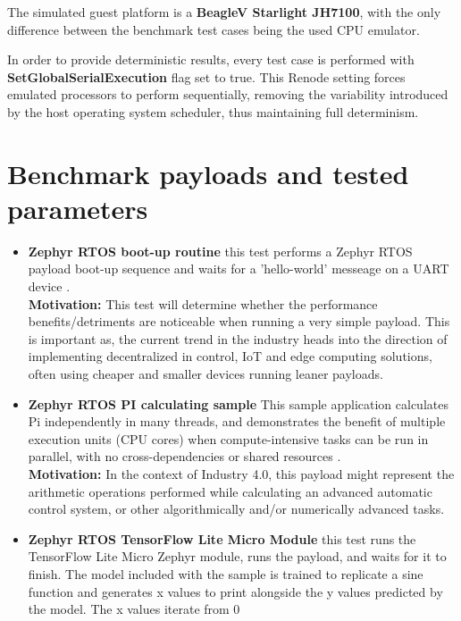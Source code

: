 The simulated guest platform is a \textbf{BeagleV Starlight JH7100}, with the only difference between the benchmark test
cases being the used CPU emulator.

In order to provide deterministic results, every test case is performed with \textbf{SetGlobalSerialExecution}
flag set to true. This Renode setting forces emulated processors to perform sequentially, removing the variability
introduced by the host operating system scheduler, thus maintaining full determinism.

\pagebreak

\section{Benchmark payloads and tested parameters}

\begin{itemize}
    \item{\textbf{Zephyr RTOS boot-up routine} this test performs a Zephyr RTOS payload boot-up sequence and waits for
    a 'hello-world' messeage on a UART device \cite{ZephyrHello}.\\
    \textbf{Motivation:} This test will determine whether the performance benefits/detriments are noticeable when
    running a very simple payload. This is important as, the current trend in the industry heads into the
    direction of implementing decentralized in control, IoT and edge computing solutions, often using cheaper and
    smaller devices running leaner payloads.}
    \item{\textbf{Zephyr RTOS PI calculating sample} This sample application calculates Pi independently in many
    threads, and demonstrates the benefit of multiple execution units (CPU cores) when compute-intensive tasks can be
    run in parallel, with no cross-dependencies or shared resources \cite{ZephyrPi}.\\
    \textbf{Motivation:} In the context of Industry 4.0, this payload might represent the arithmetic operations
    performed while calculating an advanced automatic control system, or other algorithmically and/or numerically
    advanced tasks.}
    \item{\textbf{Zephyr RTOS TensorFlow Lite Micro Module} this test runs the TensorFlow Lite Micro Zephyr module,
    runs the payload, and waits for it to finish. The model included with the sample is trained to replicate a sine
    function and generates x values to print alongside the y values predicted by the model. The x values iterate from 0
}
\end{itemize}
